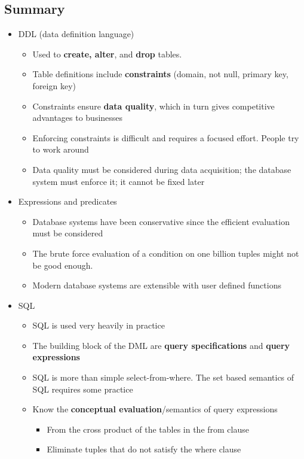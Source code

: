 \subsection{Summary}
\begin{itemize}
    \item DDL (data definition language)
    \begin{itemize}
        \item Used to \textbf{create, alter}, and \textbf{drop} tables.
        \item Table definitions include \textbf{constraints} (domain, not null, primary key, foreign key)
        \item Constraints ensure \textbf{data quality}, which in turn gives competitive advantages to businesses
        \item Enforcing constraints is difficult and requires a focused effort. People try to work around
        \item Data quality must be considered during data acquisition; the database system must enforce it; it cannot be fixed later
    \end{itemize}
    \item Expressions and predicates
    \begin{itemize}
        \item Database systems have been conservative since the efficient evaluation must be considered
        \item The brute force evaluation of a condition on one billion tuples might not be good enough.
        \item Modern database systems are extensible with user defined functions
    \end{itemize}
    \item SQL
    \begin{itemize}
        \item SQL is used very heavily in practice
        \item The building block of the DML are \textbf{query specifications} and \textbf{query expressions}
        \item SQL is more than simple select-from-where. The set based semantics of SQL requires some practice
        \item Know the \textbf{conceptual evaluation}/semantics of query expressions
        \begin{itemize}
            \item From the cross product of the tables in the from clause
            \item Eliminate tuples that do not satisfy the where clause

\end{itemize}
\end{itemize}
\end{itemize}

